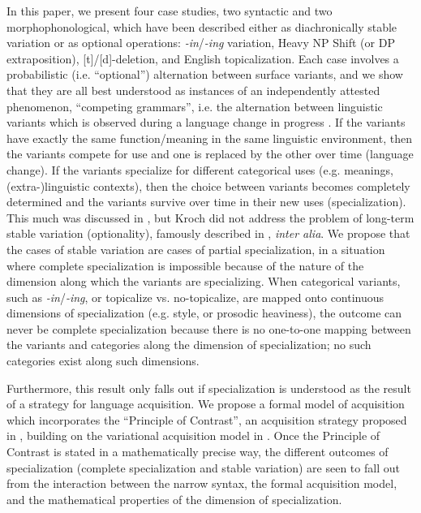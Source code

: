 \documentclass[a4paper,aps,prl,12pt,tightenlines,superscriptaddress]{revtex4}
\begin{document}
In this paper, we present four case studies, two syntactic and two morphophonological, which have been described either as diachronically stable variation or as optional operations: \textsl{-in}/\textsl{-ing} variation, Heavy NP Shift (or DP extraposition), [t]/[d]-deletion, and English topicalization.
Each case involves a probabilistic (i.e. ``optional'') alternation between surface variants, and we show that they are all best understood as instances of an independently attested phenomenon, ``competing grammars'', i.e. the alternation between linguistic variants which is observed during a language change in progress \citep[][]{kroch1989}.
If the variants have exactly the same function/meaning in the same linguistic environment, then the variants compete for use and one is replaced by the other over time (language change). 
If the variants specialize for different categorical uses (e.g. meanings, (extra-)linguistic  contexts), then the choice between variants becomes completely determined and the variants survive over time in their new uses (specialization). 
This much was discussed in \citet{kroch1994}, but Kroch did not address the problem of long-term stable variation (optionality), famously described in \citet{labov1989}, \textsl{inter alia}. 
We propose that the cases of stable variation are cases of partial specialization, in a situation where complete specialization is impossible because of the nature of the dimension along which the variants are specializing.
When categorical variants, such as \textsl{-in}/\textsl{-ing}, or topicalize vs. no-topicalize, are mapped onto continuous dimensions of specialization (e.g. style, or prosodic heaviness), the outcome can never be complete specialization because there is no one-to-one mapping between the variants and categories along the dimension of specialization; no such categories exist along such dimensions.
 
Furthermore, this result only falls out if specialization is understood as the result of a strategy for language acquisition. 
We propose a formal model of acquisition which incorporates the ``Principle of Contrast'', an acquisition strategy proposed in \citet{clark1987, clark1990}, building on the variational acquisition model in \citet{yang2000}.
Once the Principle of Contrast is stated in a mathematically precise way, the different outcomes of specialization (complete specialization and stable variation) are seen to fall out from the interaction between the narrow syntax, the formal acquisition model, and the mathematical properties of the dimension of specialization.



\end{document}
